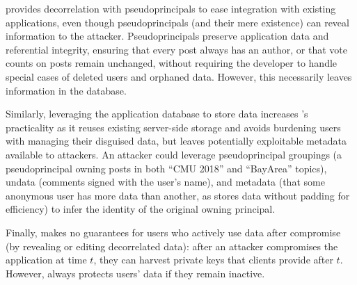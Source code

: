 %
\sys provides decorrelation with pseudoprincipals to ease integration with
existing applications, even though pseudoprincipals (and their mere existence) can
reveal information to the attacker.
%
Pseudoprincipals preserve application data and referential integrity, ensuring that
\eg every post always has an author, or that vote counts on posts remain unchanged,
without requiring the developer to handle special cases of deleted users and
orphaned data.
%
However, this necessarily leaves information in the database.
%

Similarly, leveraging the application database to store \xxed data increases \sys's
practicality as it reuses existing server-side storage and avoids burdening
users with managing their disguised data, but leaves potentially
exploitable metadata available to attackers.
%
An attacker could leverage pseudoprincipal groupings (\eg a pseudoprincipal
owning posts in both ``CMU 2018'' and ``BayArea'' topics), un\xxed data
(\eg comments signed with the user's name), and \sys metadata (\eg that some
anonymous user has more \xxed data than another, as \sys stores \xxed data without
padding for efficiency) to infer the identity of the original owning principal.

Finally, \sys makes no guarantees for users who actively use \xxed data after
compromise (\eg by revealing or editing decorrelated data): after an attacker
compromises the application at time $t$, they can harvest private keys that
clients provide after $t$.
%
However, \sys always protects users' \xxed data if they remain inactive.
%
%
%
%

%
%

%

